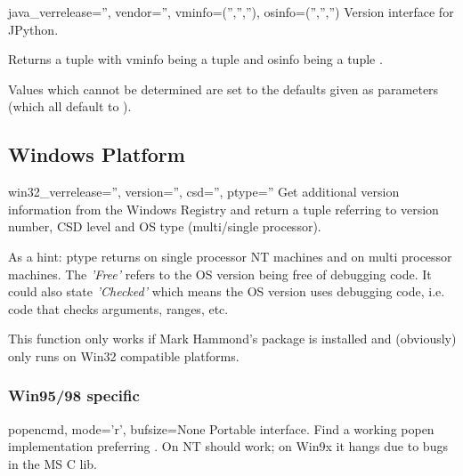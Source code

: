 \begin{funcdesc}{java_ver}{release='', vendor='', vminfo=('','',''), osinfo=('','','')}
	Version interface for JPython.
	
	Returns a tuple  with vminfo being
	a tuple  and osinfo being a
	tuple .
	
	Values which cannot be determined are set to the defaults
	given as parameters (which all default to ).
\end{funcdesc}

\subsection{Windows Platform}

\begin{funcdesc}{win32_ver}{release='', version='', csd='', ptype=''}
	Get additional version information from the Windows Registry
	and return a tuple  referring to version
	number, CSD level and OS type (multi/single	processor).
	
	As a hint: ptype returns  on single
	processor NT machines and  on multi
	processor machines. The \emph{'Free'} refers to the OS version being
	free of debugging code. It could also state \emph{'Checked'} which
	means the OS version uses debugging code, i.e. code that
	checks arguments, ranges, etc.

\begin{notice}[note]
	This function only works if Mark Hammond's 
	package is installed and (obviously) only runs on Win32
	compatible platforms.
\end{notice}

\end{funcdesc}

\subsubsection{Win95/98 specific}

\begin{funcdesc}{popen}{cmd, mode='r', bufsize=None}
	Portable  interface.
    Find a working popen implementation preferring .
    On NT  should work; on Win9x 
    it hangs due to bugs in the MS C lib.
\end{funcdesc}


